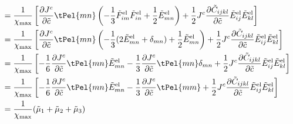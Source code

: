 \documentclass[../main.tex]{subfiles}
\begin{document}
\begin{align}
    &= \fc{1}{\xmax}\left[\pdiff{\jc}{\tc} \tPel{mn} \left( -\fc{1}{3}\tFel{im}\tFel{in}+ \fc{1}{2} \tEel{mn}\right)+ \fc{1}{2}\jc \pdiff{\td{C}_{ijkl}}{\tc}\tEel{ij}\tEel{kl} \right] \\
    &= \fc{1}{\xmax}\left[\pdiff{\jc}{\tc} \tPel{mn} \left( -\fc{1}{3}(2\tEel{mn}+\delta_{mn})+ \fc{1}{2} \tEel{mn}\right)+ \fc{1}{2}\jc \pdiff{\td{C}_{ijkl}}{\tc}\tEel{ij}\tEel{kl} \right] \\
    &= \fc{1}{\xmax}\left[-\fc{1}{6}\pdiff{\jc}{\tc} \tPel{mn} \tEel{mn} - \fc{1}{3}\pdiff{\jc}{\tc} \tPel{mn}\delta_{mn} +  \fc{1}{2}\jc \pdiff{\td{C}_{ijkl}}{\tc}\tEel{ij}\tEel{kl} \right] \\
    &= \fc{1}{\xmax}\left[-\fc{1}{6}\pdiff{\jc}{\tc} \tPel{mn} \tEel{mn} - \fc{1}{3 }\pdiff{\jc}{\tc} \tPel{mm} +  \fc{1}{2}\jc \pdiff{\td{C}_{ijkl}}{\tc}\tEel{ij}\tEel{kl} \right] \\
    &= \frac{1}{\xmax}(\td{\mu}_1 + \td{\mu}_2 + \td{\mu}_3)
\end{align}
\end{document}
